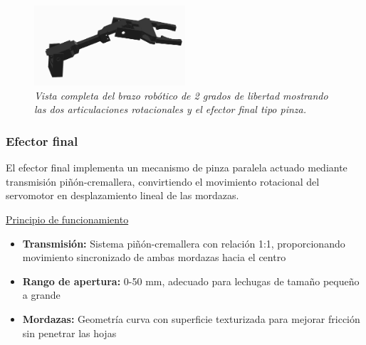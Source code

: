 \begin{figure}[H]
    \centering
    \includegraphics[width=0.5\textwidth]{img/brazo_completo.jpg}
    \caption{\textit{Vista completa del brazo robótico de 2 grados de libertad mostrando las dos articulaciones rotacionales y el efector final tipo pinza.}}
    \label{fig:brazo_Real}
\end{figure}

\subsubsection{Efector final}

El efector final implementa un mecanismo de pinza paralela actuado mediante transmisión piñón-cremallera, convirtiendo el movimiento rotacional del servomotor en desplazamiento lineal de las mordazas.

\underline{Principio de funcionamiento} \\

\begin{itemize}[label=$\bullet$]
    \item \textbf{Transmisión:} Sistema piñón-cremallera con relación 1:1, proporcionando movimiento sincronizado de ambas mordazas hacia el centro
    \item \textbf{Rango de apertura:} 0-50 mm, adecuado para lechugas de tamaño pequeño a grande
    \item \textbf{Mordazas:} Geometría curva con superficie texturizada para mejorar fricción sin penetrar las hojas
\end{itemize}


